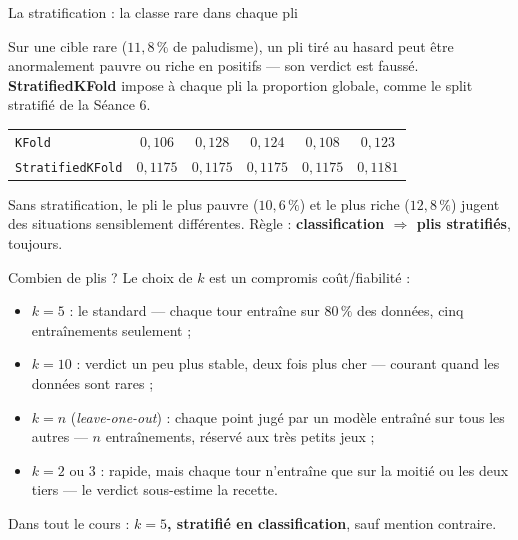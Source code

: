 \documentclass[aspectratio=169,11pt]{beamer}
\begin{document}
\begin{frame}{La stratification : la classe rare dans chaque pli}
\begin{ucaddef}
{\small Sur une cible rare ($11{,}8\,\%$ de paludisme), un pli tiré au hasard peut être anormalement pauvre ou riche en positifs — son verdict est faussé. \textbf{StratifiedKFold} impose à chaque pli la proportion globale, comme le split stratifié de la Séance 6.}
\end{ucaddef}
\begin{ucadex}
{\small \begin{center}\footnotesize\renewcommand{\arraystretch}{1.05}\begin{tabular}{l|ccccc}
\texttt{KFold} & $0{,}106$ & $0{,}128$ & $0{,}124$ & $0{,}108$ & $0{,}123$\\
\texttt{StratifiedKFold} & $0{,}1175$ & $0{,}1175$ & $0{,}1175$ & $0{,}1175$ & $0{,}1181$\\
\end{tabular}\end{center}
Sans stratification, le pli le plus pauvre ($10{,}6\,\%$) et le plus riche ($12{,}8\,\%$) jugent des situations sensiblement différentes. Règle : \textbf{classification $\Rightarrow$ plis stratifiés}, toujours.}
\end{ucadex}
\end{frame}

\begin{frame}{Combien de plis ?}
{\small Le choix de $k$ est un compromis coût/fiabilité :}
\begin{itemize}\small
  \item $k = 5$ : le standard — chaque tour entraîne sur $80\,\%$ des données, cinq entraînements seulement ;
  \item $k = 10$ : verdict un peu plus stable, deux fois plus cher — courant quand les données sont rares ;
  \item $k = n$ (\emph{leave-one-out}) : chaque point jugé par un modèle entraîné sur tous les autres — $n$ entraînements, réservé aux très petits jeux ;
  \item $k = 2$ ou $3$ : rapide, mais chaque tour n'entraîne que sur la moitié ou les deux tiers — le verdict sous-estime la recette.
\end{itemize}
{\small Dans tout le cours : \textbf{$k = 5$, stratifié en classification}, sauf mention contraire.}
\end{frame}
\end{document}
